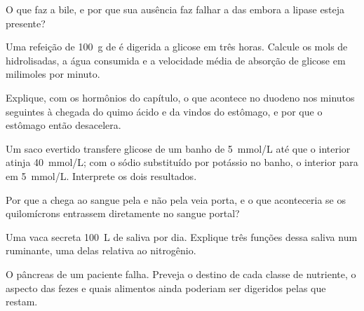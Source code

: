 \begin{exercise}[$\star$]\label{exo:b1:digestion-absorption:4}
O que faz a bile, e por que sua ausência faz falhar a  das
 embora a lipase esteja presente?
\end{exercise}

\begin{exercise}[$\star\star$]\label{exo:b1:digestion-absorption:5}
Uma refeição de \qty{100}{g} de  é digerida a glicose em três
horas. Calcule os mols de  hidrolisadas, a água
consumida e a velocidade média de absorção de glicose em milimoles por
minuto.
\end{exercise}

\begin{exercise}[$\star\star$]\label{exo:b1:digestion-absorption:6}
Explique, com os hormônios do capítulo, o que acontece no duodeno nos
minutos seguintes à chegada do quimo ácido e da  vindos do
estômago, e por que o estômago então desacelera.
\end{exercise}

\begin{exercise}[$\star\star$]\label{exo:b1:digestion-absorption:7}
Um saco evertido transfere glicose de um banho de \qty{5}{mmol/L} até
que o interior atinja \qty{40}{mmol/L}; com o sódio substituído por
potássio no banho, o interior para em \qty{5}{mmol/L}. Interprete os
dois resultados.
\end{exercise}

\begin{exercise}[$\star\star$]\label{exo:b1:digestion-absorption:8}
Por que a  chega ao sangue pela  e não pela veia porta, e
o que aconteceria se os quilomícrons entrassem diretamente no sangue
portal?
\end{exercise}

\begin{exercise}[$\star\star$]\label{exo:b1:digestion-absorption:9}
Uma vaca secreta \qty{100}{L} de saliva por dia. Explique três funções
dessa saliva num ruminante, uma delas relativa ao nitrogênio.
\end{exercise}

\begin{exercise}[$\star\star\star$]\label{exo:b1:digestion-absorption:10}
O pâncreas de um paciente falha. Preveja o destino de cada classe de
nutriente, o aspecto das fezes e quais alimentos ainda poderiam ser
digeridos pelas  que restam.
\end{exercise}

